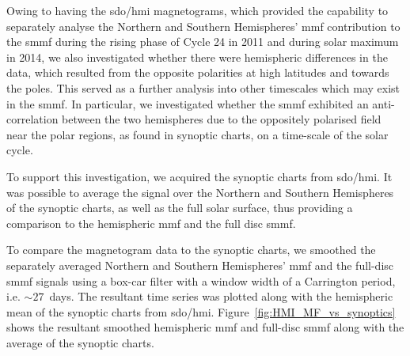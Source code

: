 Owing to having the \gls{sdo/hmi} magnetograms, which provided the capability to separately analyse the Northern and Southern Hemispheres' \gls{mmf} contribution to the \gls{smmf} during the rising phase of Cycle 24 in 2011 and during solar maximum in 2014, we also investigated whether there were hemispheric differences in the data, which resulted from the opposite polarities at high latitudes and towards the poles. This served as a further analysis into other timescales which may exist in the \gls{smmf}. In particular, we investigated whether the \gls{smmf} exhibited an anti-correlation between the two hemispheres due to the oppositely polarised field near the polar regions, as found in synoptic charts, on a time-scale of the solar cycle.

To support this investigation, we acquired the synoptic charts from \gls{sdo/hmi}. It was possible to average the signal over the Northern and Southern Hemispheres of the synoptic charts, as well as the full solar surface, thus providing a comparison to the hemispheric \gls{mmf} and the full disc \gls{smmf}.

To compare the magnetogram data to the synoptic charts, we smoothed the separately averaged Northern and Southern Hemispheres' \gls{mmf} and the full-disc \gls{smmf} signals using a box-car filter with a window width of a Carrington period, i.e. $\sim 27$~days. The resultant time series was plotted along with the hemispheric mean of the synoptic charts from \gls{sdo/hmi}. Figure~\ref{fig:HMI_MF_vs_synoptics} shows the resultant smoothed hemispheric \gls{mmf} and full-disc \gls{smmf} along with the average of the synoptic charts.

